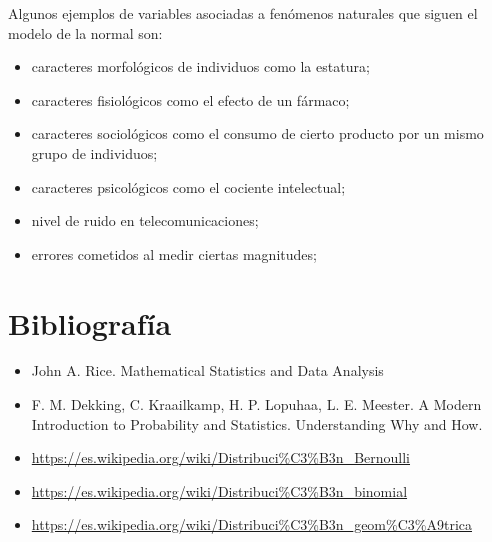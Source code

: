 \documentclass[
]{article}
\providecommand{\tightlist}{%
  \setlength{\itemsep}{0pt}\setlength{\parskip}{0pt}}
\begin{document}
Algunos ejemplos de variables asociadas a fenómenos naturales que siguen
el modelo de la normal son:

\begin{itemize}
\tightlist
\item
  caracteres morfológicos de individuos como la estatura;
\item
  caracteres fisiológicos como el efecto de un fármaco;
\item
  caracteres sociológicos como el consumo de cierto producto por un
  mismo grupo de individuos;
\item
  caracteres psicológicos como el cociente intelectual;
\item
  nivel de ruido en telecomunicaciones;
\item
  errores cometidos al medir ciertas magnitudes;
\end{itemize}

\hypertarget{bibliografuxeda}{%
\section{Bibliografía}\label{bibliografuxeda}}

\begin{itemize}
\tightlist
\item
  John A. Rice. Mathematical Statistics and Data Analysis
\item
  F. M. Dekking, C. Kraailkamp, H. P. Lopuhaa, L. E. Meester. A Modern
  Introduction to Probability and Statistics. Understanding Why and How.
\item
  \url{https://es.wikipedia.org/wiki/Distribuci\%C3\%B3n_Bernoulli}
\item
  \url{https://es.wikipedia.org/wiki/Distribuci\%C3\%B3n_binomial}
\item
  \url{https://es.wikipedia.org/wiki/Distribuci\%C3\%B3n_geom\%C3\%A9trica}
\end{itemize}
\end{document}
